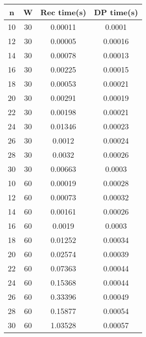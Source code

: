 \documentclass{article}
\begin{document}
\begin{multicols}{3}

        \begin{tabular}{||c c c c||} 
        \hline
        n & W & Rec time(s) & DP time(s) \\ [0.5ex] 
        \hline\hline
        10 & 30 & 0.00011 & 0.0001 \\
        \hline
        12 & 30 & 0.00005 & 0.00016 \\
        \hline
        14 & 30 & 0.00078 & 0.00013 \\
        \hline
        16 & 30 & 0.00225 & 0.00015 \\
        \hline
        18 & 30 & 0.00053 & 0.00021 \\
        \hline
        20 & 30 & 0.00291 & 0.00019 \\
        \hline
        22 & 30 & 0.00198 & 0.00021 \\
        \hline
        24 & 30 & 0.01346 & 0.00023 \\
        \hline
        26 & 30 & 0.0012 & 0.00024 \\
        \hline
        28 & 30 & 0.0032 & 0.00026 \\
        \hline
        30 & 30 & 0.00663 & 0.0003 \\
        \hline\hline
        10 & 60 & 0.00019 & 0.00028 \\
        \hline
        12 & 60 & 0.00073 & 0.00032 \\
        \hline
        14 & 60 & 0.00161 & 0.00026 \\
        \hline
        16 & 60 & 0.0019 & 0.0003 \\
        \hline
        18 & 60 & 0.01252 & 0.00034 \\
        \hline
        20 & 60 & 0.02574 & 0.00039 \\
        \hline
        22 & 60 & 0.07363 & 0.00044 \\
        \hline
        24 & 60 & 0.15368 & 0.00044 \\
        \hline
        26 & 60 & 0.33396 & 0.00049 \\
        \hline
        28 & 60 & 0.15877 & 0.00054 \\
        \hline
        30 & 60 & 1.03528 & 0.00057 \\
        \hline
        \end{tabular}
        

\end{multicols}
\end{document}
